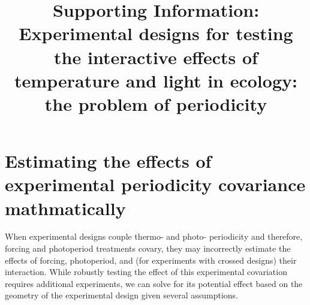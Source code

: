 \documentclass[11pt]{article}
\title{Supporting Information: Experimental designs for testing the interactive effects of temperature and light in ecology: the problem of periodicity }
\date{}
\begin{document}
\maketitle

\section*{Estimating the effects of experimental periodicity covariance mathmatically}
When experimental designs couple thermo- and photo- periodicity and therefore, forcing and photoperiod treatments covary, they may incorrectly estimate the effects of forcing, photoperiod, and (for experiments with crossed designs) their interaction. While robustly testing the effect of this experimental covariation requires additional experiments, we can solve for its potential effect based on the geometry of the experimental design given several assumptions.
\end{document}
